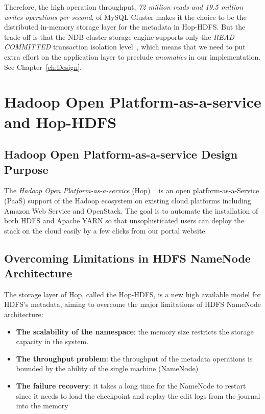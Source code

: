 \noindent Therefore, the high operation throughput, \textit{72 million reads and 19.5 million writes operations per second}, of MySQL Cluster makes it the choice to be the distributed in-memory storage layer for the metadata in Hop-HDFS. But the trade off is that the NDB cluster storage engine supports only the \textit{READ COMMITTED} transaction isolation level~\cite{ndblimits}, which means that we need to put extra effort on the application layer to preclude \textit{anomalies} in our implementation. See Chapter~\ref{ch:Design}.

\section{Hadoop Open Platform-as-a-service and Hop-HDFS}
\label{sc:Hop-HDFS}
\subsection{Hadoop Open Platform-as-a-service Design Purpose}
The \textit{Hadoop Open Platform-as-a-service} (Hop) ~\cite{hop} is an open platform-as-a-Service (PaaS) support of the Hadoop ecosystem on existing cloud platforms including Amazon Web Service and OpenStack. The goal is to automate the installation of both HDFS and Apache YARN so that unsophisticated users can deploy the stack on the cloud easily by a few clicks from our portal website. 

\subsection{Overcoming Limitations in HDFS NameNode Architecture}

\noindent The storage layer of Hop, called the Hop-HDFS, is a new high available model for HDFS's metadata, aiming to overcome the major limitations of HDFS NameNode architecture:

\begin{itemize}[noitemsep]
	\item \textbf{The scalability of the namespace}: the memory size restricts the storage capacity in the system.
	\item \textbf{The throughput problem}: the throughput of the metadata operations is bounded by the ability of the single machine (NameNode)
	\item \textbf{The failure recovery}: it takes a long time for the NameNode to restart since it needs to load the checkpoint and replay the edit logs from the journal into the memory
\end{itemize}

